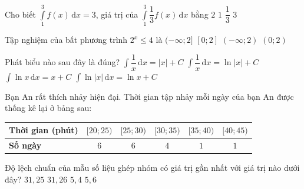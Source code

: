 \begin{ex}%
	Cho biết $\displaystyle\int\limits_1^3f(x)\mathrm{\,d}x=3$, giá trị của $\displaystyle\int\limits_1^3\dfrac{1}{3}f(x)\mathrm{\,d}x$ bằng
	\choice
	{$2$}
	{\True $1$}
	{$\dfrac{1}{3}$}
	{$3$}
\end{ex}

\begin{ex}%
	Tập nghiệm của bất phương trình $2^x\le 4$ là
	\choice
	{\True $(-\infty;2]$}
	{$[0;2]$}
	{$(-\infty;2)$}
	{$(0;2)$}
	\loigiai{
		Ta có $2^x\le 4\Leftrightarrow x\le \log_24\Leftrightarrow x\le 2$.\\
		Tập nghiệm bất phương trình là $S=(-\infty;2]$.
	}
\end{ex}

\begin{ex}%
	Phát biểu nào sau đây là đúng?
	\choice
	{$\displaystyle\int\dfrac{1}{x} \mathrm{\,d}x=|x|+C$}
	{\True $\displaystyle\int\dfrac{1}{x} \mathrm{\,d}x=\ln|x|+C$}
	{$\displaystyle\int\ln x\mathrm{\,d}x=x+C$}
	{$\displaystyle\int\ln|x|\mathrm{\,d}x=\ln x+C$}
\end{ex}

\begin{ex}%
	Bạn An rất thích nhảy hiện đại. Thời gian tập nhảy mỗi ngày của bạn An được thống kê lại ở bảng sau:
	\begin{center}
	\begin{tabular}{|l|c|c|c|c|c|}
		\hline {\bf Thời gian (phút)} & {$[20;25)$}&{$[25;30)$}&{$[30;35)$}&{$[35;40)$}&{$[40;45)$}\\
		\hline {\bf Số ngày} & $6$ & $6$ & $4$ & $1$ & $1$ \\
		\hline
	\end{tabular}
	\end{center}
	Độ lệch chuẩn của mẫu số liệu ghép nhóm có giá trị gần nhất với giá trị nào dưới đây?
	\choice
	{$31{,}25$}
	{$31{,}26$}
	{$5{,}4$}
	{\True $5{,}6$}
\end{ex}

